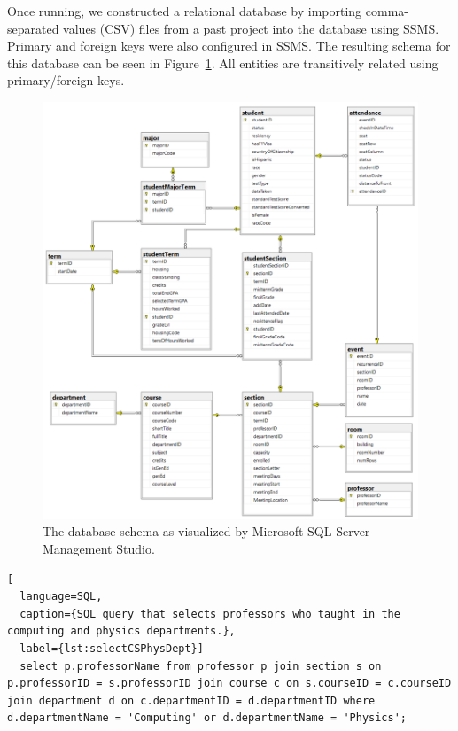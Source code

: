 Once running, we constructed a relational database by importing comma-separated values (CSV) files from a past project \cite{hybl2023} into the database using SSMS. Primary and foreign keys were also configured in SSMS. The resulting schema for this database can be seen in Figure~\ref{fig:schema}. All entities are transitively related using primary/foreign keys.
\begin{figure}[ht]
  \centering
  \includegraphics[width=\textwidth]{figures/attendanceDBSchema.png}
  \caption{The database schema as visualized by Microsoft SQL Server Management Studio.}
  \label{fig:schema}
\end{figure}

\begin{lstlisting}[
  language=SQL,
  caption={SQL query that selects professors who taught in the computing and physics departments.},
  label={lst:selectCSPhysDept}]
  select p.professorName from professor p join section s on p.professorID = s.professorID join course c on s.courseID = c.courseID join department d on c.departmentID = d.departmentID where d.departmentName = 'Computing' or d.departmentName = 'Physics';
\end{lstlisting}

